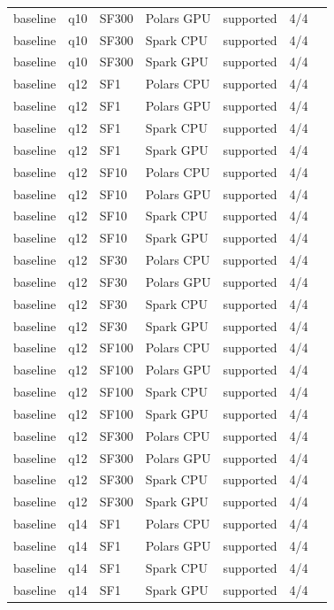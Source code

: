 \begin{longtable}{lllllll}
baseline & q10 & SF300 & Polars GPU & supported & 4/4 &  \\
baseline & q10 & SF300 & Spark CPU & supported & 4/4 &  \\
baseline & q10 & SF300 & Spark GPU & supported & 4/4 &  \\
baseline & q12 & SF1 & Polars CPU & supported & 4/4 &  \\
baseline & q12 & SF1 & Polars GPU & supported & 4/4 &  \\
baseline & q12 & SF1 & Spark CPU & supported & 4/4 &  \\
baseline & q12 & SF1 & Spark GPU & supported & 4/4 &  \\
baseline & q12 & SF10 & Polars CPU & supported & 4/4 &  \\
baseline & q12 & SF10 & Polars GPU & supported & 4/4 &  \\
baseline & q12 & SF10 & Spark CPU & supported & 4/4 &  \\
baseline & q12 & SF10 & Spark GPU & supported & 4/4 &  \\
baseline & q12 & SF30 & Polars CPU & supported & 4/4 &  \\
baseline & q12 & SF30 & Polars GPU & supported & 4/4 &  \\
baseline & q12 & SF30 & Spark CPU & supported & 4/4 &  \\
baseline & q12 & SF30 & Spark GPU & supported & 4/4 &  \\
baseline & q12 & SF100 & Polars CPU & supported & 4/4 &  \\
baseline & q12 & SF100 & Polars GPU & supported & 4/4 &  \\
baseline & q12 & SF100 & Spark CPU & supported & 4/4 &  \\
baseline & q12 & SF100 & Spark GPU & supported & 4/4 &  \\
baseline & q12 & SF300 & Polars CPU & supported & 4/4 &  \\
baseline & q12 & SF300 & Polars GPU & supported & 4/4 &  \\
baseline & q12 & SF300 & Spark CPU & supported & 4/4 &  \\
baseline & q12 & SF300 & Spark GPU & supported & 4/4 &  \\
baseline & q14 & SF1 & Polars CPU & supported & 4/4 &  \\
baseline & q14 & SF1 & Polars GPU & supported & 4/4 &  \\
baseline & q14 & SF1 & Spark CPU & supported & 4/4 &  \\
baseline & q14 & SF1 & Spark GPU & supported & 4/4 &  \\

\end{longtable}
